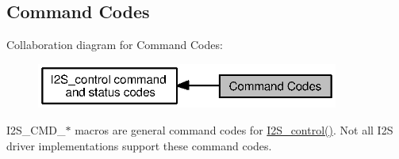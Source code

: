 \subsection{Command Codes}
\label{group___i2_s___c_m_d}
Collaboration diagram for Command Codes\+:
\nopagebreak
\begin{figure}[H]
\begin{center}
\leavevmode
\includegraphics[width=281pt]{group___i2_s___c_m_d}
\end{center}
\end{figure}
I2\+S\+\_\+\+C\+M\+D\+\_\+$\ast$ macros are general command codes for \hyperlink{_i2_s_8h_a1af19b22e9036bee696b4e4efe4916b0}{I2\+S\+\_\+control()}. Not all I2\+S driver implementations support these command codes. 